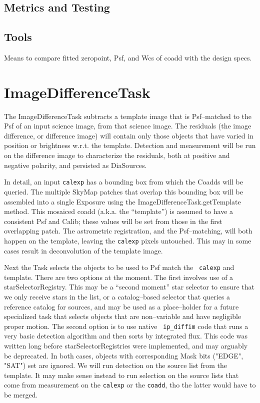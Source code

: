 \documentclass[12pt]{article}
\begin{document}
\subsection{Metrics and Testing}

\subsection{Tools}
Means to compare fitted zeropoint, Psf, and Wcs of coadd with the
design specs.


\clearpage 
\section{ImageDifferenceTask} 

The ImageDifferenceTask subtracts a template image that is
Psf--matched to the Psf of an input science image, from that science
image.  The residuals (the image difference, or difference image) will
contain only those objects that have varied in position or brightness
w.r.t. the template.  Detection and measurement will be run on the
difference image to characterize the residuals, both at positive and
negative polarity, and persisted as DiaSources.

In detail, an input {\tt calexp} has a bounding box from which the
Coadds will be queried.  The multiple SkyMap patches that overlap this
bounding box will be assembled into a single Exposure using the
ImageDifferenceTask.getTemplate method.  This mosaiced coadd
(a.k.a. the ``template'') is assumed to have a consistent Psf and
Calib; these values will be set from those in the first overlapping
patch.  The astrometric registration, and the Psf--matching, will both
happen on the template, leaving the {\tt calexp} pixels untouched.
This may in some cases result in deconvolution of the template image.

Next the Task selects the objects to be used to Psf match the {\tt
  calexp} and template.  There are two options at the moment.  The
first involves use of a starSelectorRegistry.  This may be a ``second
moment'' star selector to ensure that we only receive stars in the
list, or a catalog--based selector that queries a reference catalog
for sources, and may be used as a place--holder for a future
specialized task that selects objects that are non--variable and have
negligible proper motion.  The second option is to use native {\tt
  ip\_diffim} code that runs a very basic detection algorithm and then
sorts by integrated flux.  This code was written long before
starSelectorRegistries were implemented, and may arguably be
deprecated.  In both cases, objects with corresponding Mask bits
("EDGE", "SAT") set are ignored.  We will run detection on the source
list from the template.  It may make sense instead to run selection on
the source lists that come from measurement on the {\tt calexp} or the
{\tt coadd}, tho the latter would have to be merged.
\end{document}
